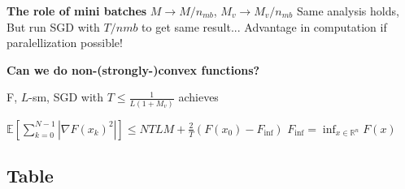 \textbf{The role of mini batches}
$M\rightarrow{M/n_{mb}}$, $M_v \rightarrow{M_v/n_{mb}}$
Same analysis holds,
But run SGD with $T/n{mb}$ to get same result...
Advantage in computation if paralellization possible!

\textbf{Can we do non-(strongly-)convex functions? }

\begin{proposition}
	F, $L$-sm, SGD with
	$T\le \frac{1}{L(1+M_v)}$ achieves

	$\mathbb{E}[\sum_{k=0}^{N-1}|\nabla F(x_k)^2|]
		\le NTLM + \frac{2}{T}(F(x_0)-F_\text{inf})$
	$F_\text{inf} = \operatorname{inf}_{x\in\mathbb{R}^n}F(x)$
\end{proposition}



\subsection{Table}

